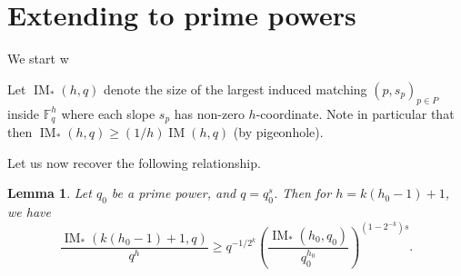 \documentclass[11pt]{article}
\theoremstyle{plain}
\newtheorem{lemma}[theorem]{Lemma}
\theoremstyle{remark}
\newcommand{\F}{\mathbb F}
\newcommand{\IM}{\operatorname{IM}}
\begin{document}
\section{Extending to prime powers}

We start w

Let $\IM_*(h,q)$ denote the size of the largest induced matching $(p,s_p)_{p\in P}$ inside $\F_q^h$ where each slope $s_p$ has non-zero $h$-coordinate. Note in particular that then $\IM_*(h,q)\ge (1/h)\IM(h,q)$ (by pigeonhole).

Let us now recover the following relationship.
\begin{lemma}
    Let $q_0$ be a prime power, and $q=q_0^s$. Then for $h=k(h_0-1)+1$, we have \[\frac{\IM_*(k(h_0-1)+1,q)}{q^h}\ge q^{-1/2^k}\left(\frac{\IM_*(h_0,q_0)}{q_0^{h_0}}\right)^{(1-2^{-k})s}.\]
\end{lemma}
\end{document}
